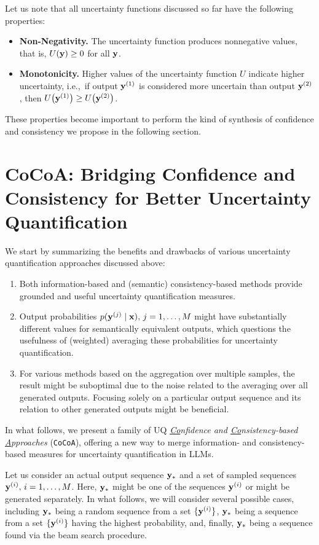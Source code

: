   Let us note that all uncertainty functions discussed so far have the following properties: 
  \begin{itemize}
    \item \textbf{Non-Negativity.} The uncertainty function produces nonnegative values, that is, \(U(\mathbf{y}) \geq 0\) for all \(\mathbf{y}\).
    
    \item \textbf{Monotonicity.} Higher values of the uncertainty function \(U\) indicate higher uncertainty, i.e.,~if output \(\mathbf{y}^{(1)}\) is considered more uncertain than output \(\mathbf{y}^{(2)}\), then \(U\bigl(\mathbf{y}^{(1)}\bigr) \geq U\bigl(\mathbf{y}^{(2)}\bigr)\).
  \end{itemize}
  These properties become important to perform the kind of synthesis of confidence and consistency we propose in the following section.

\section{CoCoA: Bridging Confidence and Consistency for Better Uncertainty Quantification}
  We start by summarizing the benefits and drawbacks of various uncertainty quantification approaches discussed above:
  \begin{enumerate}
    \item Both information-based and (semantic) consistency-based methods provide grounded and useful uncertainty quantification measures.

    \item Output probabilities $p(\mathbf{y}^{(j)} \mid \mathbf{x}), \, j = 1, \dots, M$ might have substantially different values for semantically equivalent outputs, which questions the usefulness of (weighted) averaging these probabilities for uncertainty quantification.

    \item For various methods based on the aggregation over multiple samples, the result might be suboptimal due to the noise related to the averaging over all generated outputs. Focusing solely on a particular output sequence and its relation to other generated outputs might be beneficial.
  \end{enumerate}
  In what follows, we present a family of UQ \textit{\underline{Co}nfidence and \underline{Co}nsistency-based \underline{A}pproaches} (\texttt{CoCoA}), offering a new way to merge information- and consistency-based measures for uncertainty quantification in LLMs.

  Let us consider an actual output sequence $\mathbf{y}_*$ and a set of sampled sequences $\mathbf{y}^{(i)}, \, i = 1, \dots, M$. Here, $\mathbf{y}_*$ might be one of the sequences $\mathbf{y}^{(i)}$ or might be generated separately. In what follows, we will consider several possible cases, including $\mathbf{y}_*$ being a random sequence from a set $\{\mathbf{y}^{(i)}\}$, $\mathbf{y}_*$ being a sequence from a set $\{\mathbf{y}^{(i)}\}$ having the highest probability, and, finally, $\mathbf{y}_*$ being a sequence found via the beam search procedure.

